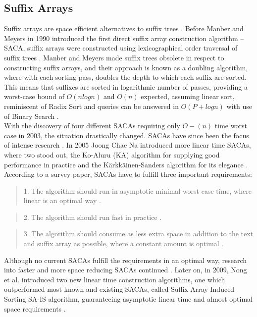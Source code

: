 \documentclass[12pt]{article} %
\begin{document}
\subsection{Suffix Arrays} \label{Suffix Arrays Section}

Suffix arrays are space efficient alternatives to suffix trees \cite{gusfield,twoeffecient}. Before Manber and Meyers in 1990 introduced the first direct suffix array construction algorithm – SACA, suffix arrays were constructed using lexicographical order traversal of suffix trees  \cite{gusfield,twoeffecient, performancesuffix, newapproach}. Manber and Meyers made suffix trees obsolete in respect to constructing suffix arrays, and their approach is known as a doubling algorithm, where with each sorting pass, doubles the depth to which each suffix are sorted. This means that suffixes are sorted in logarithmic number of passes, providing a worst-case bound of $O(n log n)$ and $O(n)$ expected, assuming linear sort, reminiscent of Radix Sort \cite{performancesuffix} and queries can be answered in $O(P + log n)$ with use of Binary Search \cite{gusfield}.
\\
With the discovery of four different SACAs requiring only $O-(n)$ time worst case in 2003, the situation drastically changed. SACAs have since been the focus of intense research \cite{performancesuffix,newapproach}. In 2005 Joong Chae Na introduced more linear time SACAs, where two stood out, the Ko-Aluru (KA) algorithm for supplying good performance in practice and the Kärkkäinen-Sanders algorithm for its elegance \cite{newapproach}. 
\\
According to a survey paper, SACAs have to fulfill three important requirements: 
\begin{quote}
1. The algorithm should run in asymptotic minimal worst case time, where linear is an optimal way \cite{newapproach}. 
\end{quote}
\begin{quote}
2. The algorithm should run fast in practice \cite{newapproach}.
\end{quote}
\begin{quote}
3. The algorithm should consume as less extra space in addition to the text and suffix array as possible, where a constant amount is optimal \cite{newapproach}.
\end{quote}
Although no current SACAs fulfill the requirements in an optimal way, research into faster and more space reducing SACAs continued \cite{newapproach}. Later on, in 2009, Nong et al. introduced two new linear time construction algorithms, one which outperformed most known and existing SACAs, called Suffix Array Induced Sorting SA-IS algorithm, guaranteeing asymptotic linear time and almost optimal space requirements \cite{newapproach}. 
\end{document}
